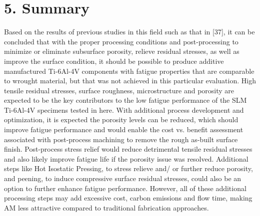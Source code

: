 \documentclass[10pt]{article}
\begin{document}
\section*{5. Summary}
Based on the results of previous studies in this field such as that in [37], it can be concluded that with the proper processing conditions and post-processing to minimize or eliminate subsurface porosity, relieve residual stresses, as well as improve the surface condition, it should be possible to produce additive manufactured Ti-6Al-4V components with fatigue properties that are comparable to wrought material, but that was not achieved in this particular evaluation. High tensile residual stresses, surface roughness, microstructure and porosity are expected to be the key contributors to the low fatigue performance of the SLM Ti-6Al-4V specimens tested in here. With additional process development and optimization, it is expected the porosity levels can be reduced, which should improve fatigue performance and would enable the cost vs. benefit assessment associated with post-process machining to remove the rough as-built surface finish. Post-process stress relief would reduce detrimental tensile residual stresses and also likely improve fatigue life if the porosity issue was resolved. Additional steps like Hot Isostatic Pressing, to stress relieve and/ or further reduce porosity, and peening, to induce compressive surface residual stresses, could also be an option to further enhance fatigue performance. However, all of these additional processing steps may add excessive cost, carbon emissions and flow time, making AM less attractive compared to traditional fabrication approaches.
\end{document}
